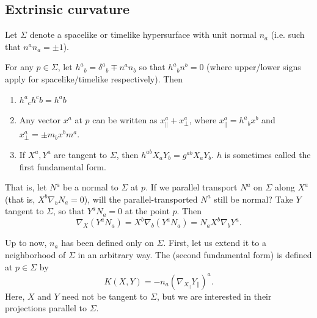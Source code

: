 \subsection*{Extrinsic curvature}
Let $\Sigma$ denote a spacelike or timelike hypersurface with unit normal $n_a$ (i.e. such that $n^a n_a=\pm 1$).
\begin{lem}
    For any $p\in \Sigma$, let $h^a{}_b = \delta^a{}_b \mp n^a n_b$ so that $h^a{}_b n^b =0$ (where upper/lower signs apply for spacelike/timelike respectively). Then
    \begin{enumerate}
        \item $h^a{}_c h^c{}b=h^a{}b$
        \item Any vector $x^a$ at $p$ can be written as $x^a_\parallel + x^a_\bot$, where $x^a_\parallel = h^a{}_b x^b$ and $x^a_\bot = \pm m_b x^b m^a$.
        \item If $X^a,Y^a$ are tangent to $\Sigma$, then $h^{ab} X_a Y_b=g^{ab} X_a Y_b$. $h$ is sometimes called the first fundamental form. 
    \end{enumerate}
\end{lem}
That is, let $N^a$ be a normal to $\Sigma$ at $p$. If we parallel transport $N^a$ on $\Sigma$ along $X^a$ (that is, $X^b \nabla_b N_a=0$), will the parallel-transported $N^a$ still be normal? Take $Y$ tangent to $\Sigma$, so that $Y^a N_a=0$ at the point $p$. Then
\begin{equation}
    \nabla_X (Y^a N_a)=X^b \nabla_b(Y^a N_a)=N_a X^b \nabla_b Y^a.
\end{equation}
\begin{defn}
    Up to now, $n_a$ has been defined only on $\Sigma$. First, let us extend it to a neighborhood of $\Sigma$ in an arbitrary way. The  (second fundamental form) is defined at $p\in \Sigma$ by
    \begin{equation}
        K(X,Y)=-n_a(\nabla_{X_\parallel} Y_{\parallel})^a.
    \end{equation}
    Here, $X$ and $Y$ need not be tangent to $\Sigma$, but we are interested in their projections parallel to $\Sigma$.
\end{defn}

